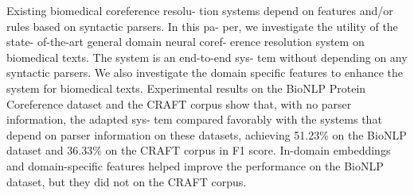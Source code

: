 Existing biomedical coreference resolu- tion systems depend on features and/or rules based on syntactic parsers. In this pa- per, we investigate the utility of the state- of-the-art general domain neural coref- erence resolution system on biomedical texts. The system is an end-to-end sys- tem without depending on any syntactic parsers. We also investigate the domain specific features to enhance the system for biomedical texts. Experimental results on the BioNLP Protein Coreference dataset and the CRAFT corpus show that, with no parser information, the adapted sys- tem compared favorably with the systems that depend on parser information on these datasets, achieving 51.23\% on the BioNLP dataset and 36.33\% on the CRAFT corpus in F1 score. In-domain embeddings and domain-specific features helped improve the performance on the BioNLP dataset, but they did not on the CRAFT corpus.
